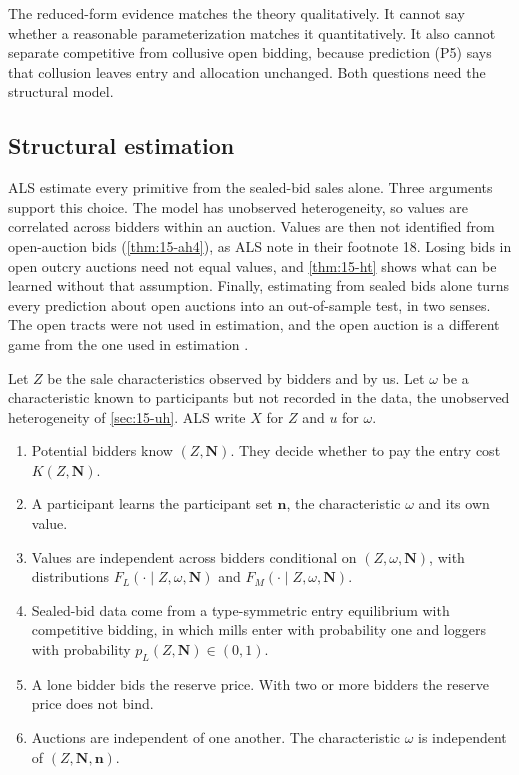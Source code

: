 The reduced-form evidence matches the theory qualitatively. It cannot say whether a reasonable
parameterization matches it quantitatively. It also cannot separate competitive from collusive open
bidding, because prediction (P5) says that collusion leaves entry and allocation unchanged. Both
questions need the structural model.

\subsection{Structural estimation}\label{sec:15-als-structural}

ALS estimate every primitive from the sealed-bid sales alone. Three arguments support this choice. The
model has unobserved heterogeneity, so values are correlated across bidders within an auction. Values are
then not identified from open-auction bids (\cref{thm:15-ah4}), as ALS note in their footnote 18. Losing
bids in open outcry auctions need not equal values, and \cref{thm:15-ht} shows what can be learned
without that assumption. Finally, estimating from sealed bids alone turns every prediction about open
auctions into an out-of-sample test, in two senses. The open tracts were not used in estimation, and the
open auction is a different game from the one used in estimation \citep[p.~235]{AtheyLevinSeira2011}.

Let $Z$ be the sale characteristics observed by bidders and by us. Let $\omega$ be a characteristic known
to participants but not recorded in the data, the unobserved heterogeneity of \cref{sec:15-uh}. ALS write
$X$ for $Z$ and $u$ for $\omega$.

\begin{assumption}\label{ass:15-als}
\leavevmode
\begin{enumerate}[label=(\roman*)]
\item Potential bidders know $(Z,\bm N)$. They decide whether to pay the entry cost $K(Z,\bm N)$.
\item A participant learns the participant set $\bm n$, the characteristic $\omega$ and its own value.
\item Values are independent across bidders conditional on $(Z,\omega,\bm N)$, with distributions
$F_L(\cdot\mid Z,\omega,\bm N)$ and $F_M(\cdot\mid Z,\omega,\bm N)$.
\item Sealed-bid data come from a type-symmetric entry equilibrium with competitive bidding, in which
mills enter with probability one and loggers with probability $p_L(Z,\bm N)\in(0,1)$.
\item A lone bidder bids the reserve price. With two or more bidders the reserve price does not bind.
\item Auctions are independent of one another. The characteristic $\omega$ is independent of
$(Z,\bm N,\bm n)$.
\end{enumerate}
\end{assumption}


